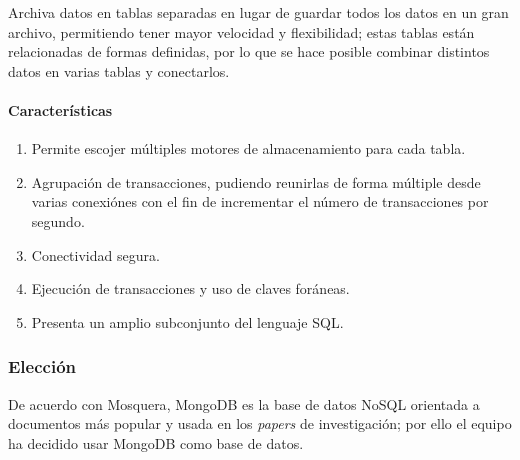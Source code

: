 Archiva datos en tablas separadas en lugar de guardar todos los datos en un gran archivo, permitiendo tener mayor velocidad y flexibilidad; estas tablas están relacionadas de formas definidas, por lo que se hace posible combinar distintos datos en varias tablas y conectarlos.

\paragraph*{Características}
\begin{enumerate}
    \item Permite escojer múltiples motores de almacenamiento para cada tabla.
    \item Agrupación de transacciones, pudiendo reunirlas de forma múltiple desde varias conexiónes con el fin de incrementar el número de transacciones por segundo.
    \item Conectividad segura.
    \item Ejecución de transacciones y uso de claves foráneas.
    \item Presenta un amplio subconjunto del lenguaje SQL.
\end{enumerate}

\subsubsection*{Elección}

De acuerdo con Mosquera\cite{martinez-mosquera_modeling_2020}, MongoDB es la base de datos NoSQL orientada a documentos más popular y usada en los \textit{papers} de investigación; por ello el equipo ha decidido usar MongoDB como base de datos.

